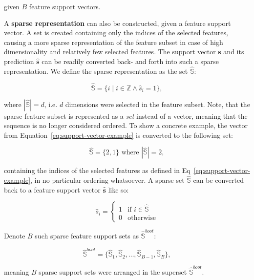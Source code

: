 \documentclass{article}
\begin{document}
given $B$ feature support vectors.

A \textbf{sparse representation} can also be constructed, given a feature support vector. A set is created containing only the indices of the selected features, causing a more sparse representation of the feature subset in case of high dimensionality and relatively few selected features. The support vector $\boldsymbol{s}$ and its prediction $\hat{\boldsymbol{s}}$ can be readily converted back- and forth into such a sparse representation. We define the sparse representation as the set $\hat{\mathbb{S}}$:

\begin{equation}
\hat{\mathbb{S}} = \{i \mid i \in \mathbb{Z} \wedge \hat{s}_i = 1 \},
\end{equation}

where $| \hat{\mathbb{S}} | = d$, i.e. $d$ dimensions were selected in the feature subset. Note, that the sparse feature subset is represented as a \textit{set} instead of a vector, meaning that the sequence is no longer considered ordered. To show a concrete example, the vector from Equation~\ref{eq:support-vector-example} is converted to the following set:

\begin{equation}
\hat{\mathbb{S}} = \{ 2, 1 \} \text{ where } | \hat{\mathbb{S}} | = 2,
\end{equation}

containing the indices of the selected features as defined in Eq~\ref{eq:support-vector-example}, in no particular ordering whatsoever. A sparse set $\hat{\mathbb{S}}$ can be converted back to a feature support vector $\hat{\boldsymbol{s}}$ like so:

\begin{equation}
\hat{s}_i = \begin{cases}
  1 & \text{if } i \in \hat{\mathbb{S}}\\
  0 & \text{otherwise}
\end{cases}
\end{equation}

Denote $B$ such sparse feature support sets as $\hat{\mathbb{S}}^{boot}$:

\begin{equation}\label{eq:feature-support-superset}
\hat{\mathbb{S}}^{boot} = \{ \hat{\mathbb{S}}_1, \hat{\mathbb{S}}_2, \ldots, \hat{\mathbb{S}}_{B-1}, \hat{\mathbb{S}}_B \},
\end{equation}

meaning $B$ sparse support sets were arranged in the superset $\hat{\mathbb{S}}^{boot}$.
\end{document}
